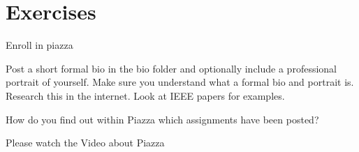 \section{Exercises}


\begin{exercise}\label{E:Piazza.1}
 Enroll in piazza
\end{exercise}

\begin{exercise}\label{E:Piazza.2}
  Post a short formal bio in the bio folder and optionally
  include a professional portrait of yourself. Make sure you
  understand what a formal bio  and portrait is. Research this in the
  internet. Look at IEEE papers for examples.
\end{exercise}

\begin{exercise}\label{E:Piazza.3}
  How do you find out within Piazza which assignments have
  been posted?
\end{exercise}

\begin{exercise}\label{E:Piazza.4}
  Please watch the Video about Piazza
\end{exercise}




